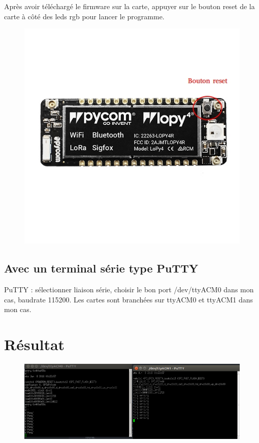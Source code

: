 \documentclass{article}
\begin{document}
Après avoir téléchargé le firmware sur la carte, appuyer sur le bouton reset de la carte à côté des leds rgb pour lancer le programme.

\begin{figure}[H]
\begin{center}
\advance\leftskip-3cm
\advance\rightskip-3cm
\includegraphics[keepaspectratio=true,scale=0.3]{reset.jpeg}
\label{visina8}
\end{center}\end{figure}


\subsection{Avec un terminal série type PuTTY}

PuTTY : sélectionner liaison série, choisir le bon port /dev/ttyACM0 dans mon cas, baudrate 115200.
Les cartes sont branchées sur ttyACM0 et ttyACM1 dans mon cas. 




\section{Résultat}
\begin{figure}[H]
\begin{center}
\advance\leftskip-3cm
\advance\rightskip-3cm
\includegraphics[keepaspectratio=true,scale=0.5]{ping_pong3.png}
\label{visina8}
\end{center}\end{figure}
\end{document}
